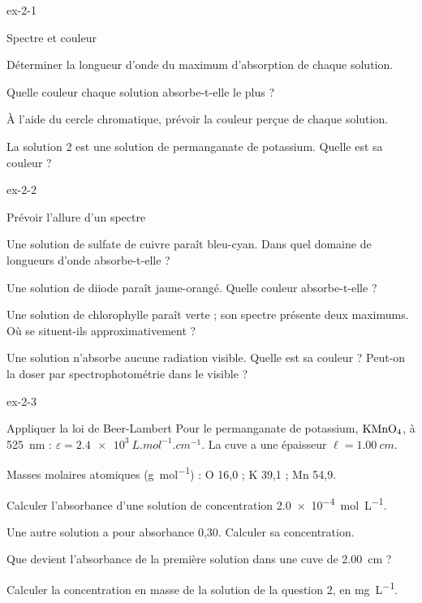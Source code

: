 \begin{blocLivre}{ex-2-1}
\begin{exercice}[1]{Spectre et couleur}
\begin{questions}
\item Déterminer la longueur d'onde du maximum d'absorption de chaque solution.
\item Quelle couleur chaque solution absorbe-t-elle le plus ?
\item À l'aide du cercle chromatique, prévoir la couleur perçue de chaque solution.
\item La solution 2 est une solution de permanganate de potassium. Quelle est sa couleur ?
\end{questions}
\end{exercice}
\end{blocLivre}
\begin{blocLivre}{ex-2-2}
\begin{exercice}[1]{Prévoir l'allure d'un spectre}
\begin{questions}
\item Une solution de sulfate de cuivre paraît bleu-cyan. Dans quel domaine de longueurs d'onde absorbe-t-elle ?
\item Une solution de diiode paraît jaune-orangé. Quelle couleur absorbe-t-elle ?
\item Une solution de chlorophylle paraît verte ; son spectre présente deux maximums. Où se situent-ils approximativement ?
\item Une solution n'absorbe aucune radiation visible. Quelle est sa couleur ? Peut-on la doser par spectrophotométrie dans
le visible ?
\end{questions}
\end{exercice}
\end{blocLivre}
\begin{blocLivre}{ex-2-3}
\begin{exercice}[1]{Appliquer la loi de Beer-Lambert}
Pour le permanganate de potassium, $\ce{KMnO4}$, à \qty{525}{nm} : $\varepsilon=\qty{2,4e3}{L.mol^{-1}.cm^{-1}}$. La cuve a une épaisseur $\ell=\qty{1,00}{cm}$.
\begin{donnees}
Masses molaires atomiques (\unit{g.mol^{-1}}) : O 16,0 ; K 39,1 ; Mn 54,9.
\end{donnees}
\begin{questions}
\item Calculer l'absorbance d'une solution de concentration \qty{2,0e-4}{mol.L^{-1}}.
\item Une autre solution a pour absorbance 0,30. Calculer sa concentration.
\item Que devient l'absorbance de la première solution dans une cuve de \qty{2,00}{cm} ?
\item Calculer la concentration en masse de la solution de la question 2, en \unit{mg.L^{-1}}.
\end{questions}
\end{exercice}
\end{blocLivre}

